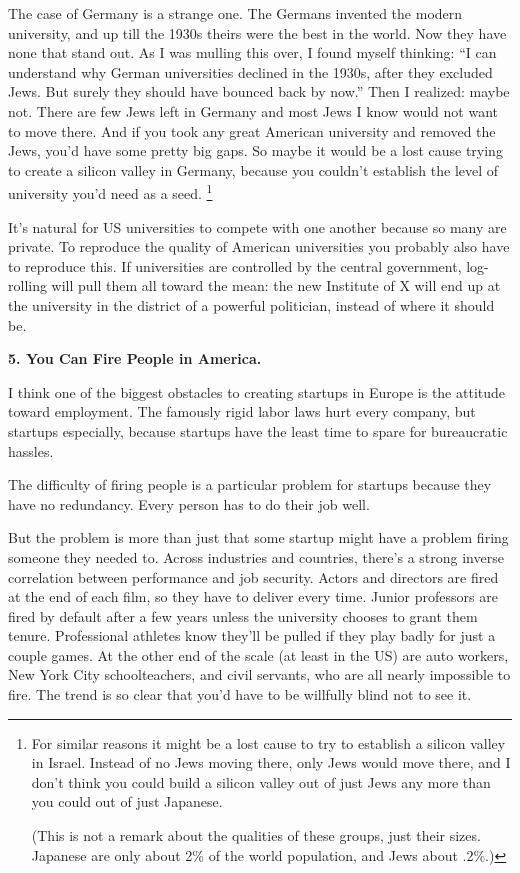 The case of Germany is a strange one. The Germans invented the modern
university, and up till the 1930s theirs were the best in the world. Now
they have none that stand out. As I was mulling this over, I found
myself thinking: ``I can understand why German universities declined in
the 1930s, after they excluded Jews. But surely they should have bounced
back by now.'' Then I realized: maybe not. There are few Jews left in
Germany and most Jews I know would not want to move there. And if you
took any great American university and removed the Jews, you'd have some
pretty big gaps. So maybe it would be a lost cause trying to create a
silicon valley in Germany, because you couldn't establish the level of
university you'd need as a seed. \footnote{For similar reasons it might be a lost cause to try to establish
a silicon valley in Israel. Instead of no Jews moving there, only Jews
would move there, and I don't think you could build a silicon valley out
of just Jews any more than you could out of just Japanese.

(This is not a remark about the qualities of these groups, just their
sizes. Japanese are only about 2\% of the world population, and Jews
about .2\%.)}

It's natural for US universities to compete with one another because so
many are private. To reproduce the quality of American universities you
probably also have to reproduce this. If universities are controlled by
the central government, log-rolling will pull them all toward the mean:
the new Institute of X will end up at the university in the district of
a powerful politician, instead of where it should be.

\textbf{5. You Can Fire People in America.}

I think one of the biggest obstacles to creating startups in Europe is
the attitude toward employment. The famously rigid labor laws hurt every
company, but startups especially, because startups have the least time
to spare for bureaucratic hassles.

The difficulty of firing people is a particular problem for startups
because they have no redundancy. Every person has to do their job well.

But the problem is more than just that some startup might have a problem
firing someone they needed to. Across industries and countries, there's
a strong inverse correlation between performance and job security.
Actors and directors are fired at the end of each film, so they have to
deliver every time. Junior professors are fired by default after a few
years unless the university chooses to grant them tenure. Professional
athletes know they'll be pulled if they play badly for just a couple
games. At the other end of the scale (at least in the US) are auto
workers, New York City schoolteachers, and civil servants, who are all
nearly impossible to fire. The trend is so clear that you'd have to be
willfully blind not to see it.

